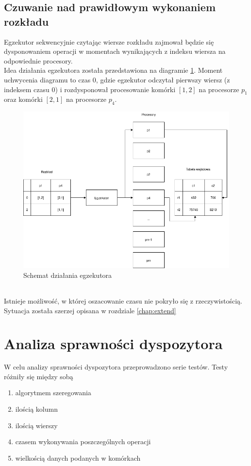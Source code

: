 \documentclass[brudnopis]{xmgr}
\begin{document}
\section{Czuwanie nad prawidłowym wykonaniem rozkładu}

Egzekutor sekwencyjnie czytając wiersze rozkładu zajmował będzie się dysponowaniem operacji w momentach wynikających z indeksu wiersza na odpowiednie procesory.
\medskip\\

Idea działania egzekutora została przedstawiona na diagramie \ref{diag:executor}. Moment uchwycenia diagramu 
to czas 0, gdzie egzekutor odczytał pierwszy wiersz (z indeksem czasu 0) i rozdysponował procesowanie komórki $[1,2]$ na procesorze $p_1$ oraz komórki $[2,1]$ na procesorze $p_4$.
\medskip\\

\begin{figure}[!tbh]
\centering
\includegraphics[width=.8\hsize]{fig/executor.png}
\caption{Schemat działania egzekutora\label{diag:executor}}
\end{figure}
\medskip\\

Istnieje możliwość, w której oszacowanie czasu nie pokryło się z rzeczywistością. Sytuacja została szerzej opisana w rozdziale \ref{chap:extend}

\chapter{Analiza sprawności dyspozytora}

W celu analizy sprawności dyspozytora przeprowadzono serie testów.
Testy różniły się między sobą
\begin{enumerate}
    \item algorytmem szeregowania
    \item ilością kolumn
    \item ilością wierszy
    \item czasem wykonywania poszczególnych operacji
    \item wielkością danych podanych w komórkach
\end{enumerate}
\end{document}
